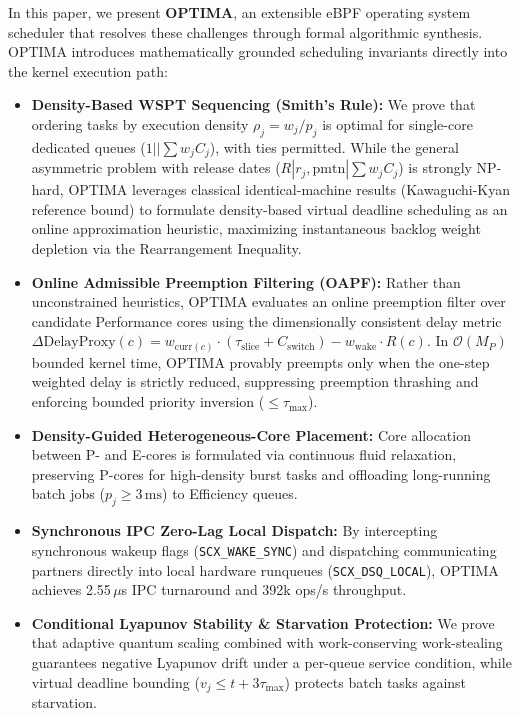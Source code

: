\documentclass[letterpaper,twocolumn,10pt]{article}
\begin{document}
In this paper, we present \textbf{OPTIMA}, an extensible eBPF operating system scheduler that resolves these challenges through formal algorithmic synthesis. OPTIMA introduces mathematically grounded scheduling invariants directly into the kernel execution path:
\begin{itemize}
    \item \textbf{Density-Based WSPT Sequencing (Smith's Rule):} We prove that ordering tasks by execution density $\rho_j = w_j / p_j$ is optimal for single-core dedicated queues ($1 || \sum w_j C_j$), with ties permitted. While the general asymmetric problem with release dates ($R | r_j, \text{pmtn} | \sum w_j C_j$) is strongly NP-hard, OPTIMA leverages classical identical-machine results (Kawaguchi-Kyan reference bound) to formulate density-based virtual deadline scheduling as an online approximation heuristic, maximizing instantaneous backlog weight depletion via the Rearrangement Inequality.
    \item \textbf{Online Admissible Preemption Filtering (OAPF):} Rather than unconstrained heuristics, OPTIMA evaluates an online preemption filter over candidate Performance cores using the dimensionally consistent delay metric $\Delta\mathrm{DelayProxy}(c) = w_{\mathrm{curr}(c)} \cdot (\tau_{\mathrm{slice}} + C_{\mathrm{switch}}) - w_{\mathrm{wake}} \cdot R(c)$. In $\mathcal{O}(M_P)$ bounded kernel time, OPTIMA provably preempts only when the one-step weighted delay is strictly reduced, suppressing preemption thrashing and enforcing bounded priority inversion ($\le \tau_{\max}$).
    \item \textbf{Density-Guided Heterogeneous-Core Placement:} Core allocation between P- and E-cores is formulated via continuous fluid relaxation, preserving P-cores for high-density burst tasks and offloading long-running batch jobs ($p_j \ge 3\,\text{ms}$) to Efficiency queues.
    \item \textbf{Synchronous IPC Zero-Lag Local Dispatch:} By intercepting synchronous wakeup flags (\texttt{SCX\_WAKE\_SYNC}) and dispatching communicating partners directly into local hardware runqueues (\texttt{SCX\_DSQ\_LOCAL}), OPTIMA achieves 2.55\,$\mu$s IPC turnaround and 392k ops/s throughput.
    \item \textbf{Conditional Lyapunov Stability \& Starvation Protection:} We prove that adaptive quantum scaling combined with work-conserving work-stealing guarantees negative Lyapunov drift under a per-queue service condition, while virtual deadline bounding ($v_j \le t + 3\tau_{\max}$) protects batch tasks against starvation.
\end{itemize}
\end{document}

